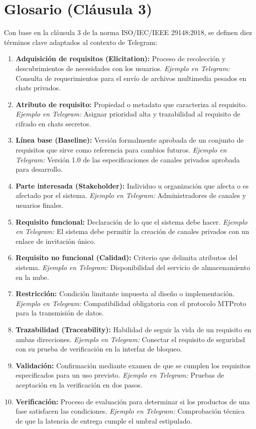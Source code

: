 \documentclass[11pt,a4paper]{article}
\begin{document}
\section{Glosario (Cláusula 3)}
Con base en la cláusula 3 de la norma ISO/IEC/IEEE 29148:2018, se definen diez términos clave adaptados al contexto de Telegram:
\begin{enumerate}
    \item \textbf{Adquisición de requisitos (Elicitation):} Proceso de recolección y descubrimientos de necesidades con los usuarios. \textit{Ejemplo en Telegram:} Consulta de requerimientos para el envío de archivos multimedia pesados en chats privados.
    \item \textbf{Atributo de requisito:} Propiedad o metadato que caracteriza al requisito. \textit{Ejemplo en Telegram:} Asignar prioridad alta y trazabilidad al requisito de cifrado en chats secretos.
    \item \textbf{Línea base (Baseline):} Versión formalmente aprobada de un conjunto de requisitos que sirve como referencia para cambios futuros. \textit{Ejemplo en Telegram:} Versión 1.0 de las especificaciones de canales privados aprobada para desarrollo.
    \item \textbf{Parte interesada (Stakeholder):} Individuo u organización que afecta o es afectado por el sistema. \textit{Ejemplo en Telegram:} Administradores de canales y usuarios finales.
    \item \textbf{Requisito funcional:} Declaración de lo que el sistema debe hacer. \textit{Ejemplo en Telegram:} El sistema debe permitir la creación de canales privados con un enlace de invitación único.
    \item \textbf{Requisito no funcional (Calidad):} Criterio que delimita atributos del sistema. \textit{Ejemplo en Telegram:} Disponibilidad del servicio de almacenamiento en la nube.
    \item \textbf{Restricción:} Condición limitante impuesta al diseño o implementación. \textit{Ejemplo en Telegram:} Compatibilidad obligatoria con el protocolo MTProto para la transmisión de datos.
    \item \textbf{Trazabilidad (Traceability):} Habilidad de seguir la vida de un requisito en ambas direcciones. \textit{Ejemplo en Telegram:} Conectar el requisito de seguridad con su prueba de verificación en la interfaz de bloqueo.
    \item \textbf{Validación:} Confirmación mediante examen de que se cumplen los requisitos especificados para un uso previsto. \textit{Ejemplo en Telegram:} Pruebas de aceptación en la verificación en dos pasos.
    \item \textbf{Verificación:} Proceso de evaluación para determinar si los productos de una fase satisfacen las condiciones. \textit{Ejemplo en Telegram:} Comprobación técnica de que la latencia de entrega cumple el umbral estipulado.
\end{enumerate}
\end{document}
